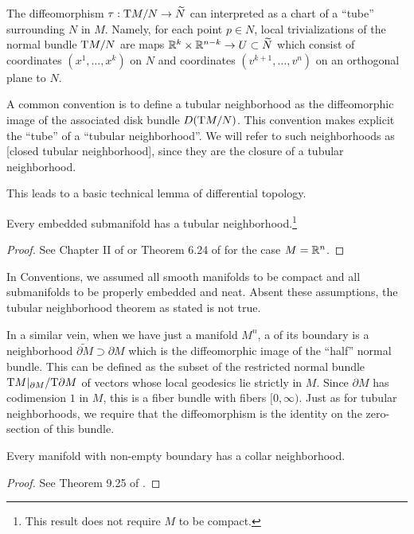 The diffeomorphism $\tau : \mathrm{T} M/N \to \widetilde{N}$ can interpreted as a chart of a ``tube'' surrounding $N$ in $M$. Namely, for each point $p\in N$, local trivializations of the normal bundle $\mathrm{T} M/N$ are maps $\mathbb{R}^k \times \mathbb{R}^{n-k}\to U\subset \widetilde{N}$ which consist of coordinates $(x^1,\ldots,x^k)$ on $N$ and coordinates $(v^{k+1},\ldots, v^{n})$ on an orthogonal plane to $N$.

\begin{remark}
	A common convention is to define a tubular neighborhood as the diffeomorphic image of the associated disk bundle ${D}(\mathrm{T} M/N)$. This convention makes explicit the ``tube'' of a  ``tubular neighborhood''. We will refer to such neighborhoods as [closed tubular neighborhood], since they are the closure of a tubular neighborhood.
\end{remark}

This leads to a basic technical lemma of differential topology.

\begin{theorem}\label{thm:tubular-neighborhood}
	Every embedded submanifold has a tubular neighborhood.\footnote{This result does not require $M$ to be compact.}
\end{theorem}
\begin{proof}
	See Chapter II of \cite{kosinski1993differential} or Theorem 6.24 of \cite{lee2013smooth} for the case $M=\mathbb{R}^n$.
\end{proof}

\begin{warning}
	In Conventions, we assumed all smooth manifolds to be compact and all submanifolds to be properly embedded and neat. Absent these assumptions, the tubular neighborhood theorem as stated is not true.
\end{warning}

In a similar vein, when we have just a manifold $M^n$, a  of its boundary is a neighborhood $\widetilde{\partial M}\supset \partial M$ which is the diffeomorphic image of the ``half'' normal bundle. This can be defined as the subset of the restricted normal bundle $\mathrm{T} M|_{\partial M} / \mathrm{T} \partial M$ of vectors whose local geodesics lie strictly in $M$. Since $\partial M$ has codimension $1$ in $M$, this is a fiber bundle with fibers $[0,\infty)$. Just as for tubular neighborhoods, we require that the diffeomorphism is the identity on the zero-section of this bundle.

\begin{theorem}\label{thm:collar-neighborhood}
	Every manifold with non-empty boundary has a collar neighborhood.
\end{theorem}
\begin{proof}
	See Theorem 9.25 of \cite{lee2013smooth}.
\end{proof}

